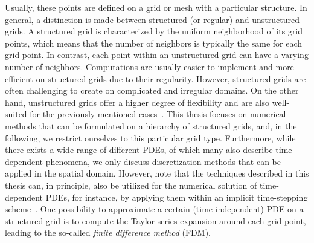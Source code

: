 Usually, these points are defined on a grid or mesh with a particular structure.
In general, a distinction is made between structured (or regular) and unstructured grids.
A structured grid is characterized by the uniform neighborhood of its grid points, which means that the number of neighbors is typically the same for each grid point.
In contrast, each point within an unstructured grid can have a varying number of neighbors.
Computations are usually easier to implement and more efficient on structured grids due to their regularity.
However, structured grids are often challenging to create on complicated and irregular domains.
On the other hand, unstructured grids offer a higher degree of flexibility and are also well-suited for the previously mentioned cases~\cite{knupp2020fundamentals}.
This thesis focuses on numerical methods that can be formulated on a hierarchy of structured grids, and, in the following, we restrict ourselves to this particular grid type.
Furthermore, while there exists a wide range of different PDEs, of which many also describe time-dependent phenomena, we only discuss discretization methods that can be applied in the spatial domain.
However, note that the techniques described in this thesis can, in principle, also be utilized for the numerical solution of time-dependent PDEs, for instance, by applying them within an implicit time-stepping scheme~\cite{ames2014numerical}.
One possibility to approximate a certain (time-independent) PDE on a structured grid is to compute the Taylor series expansion around each grid point, leading to the so-called \emph{finite difference method} (FDM).
